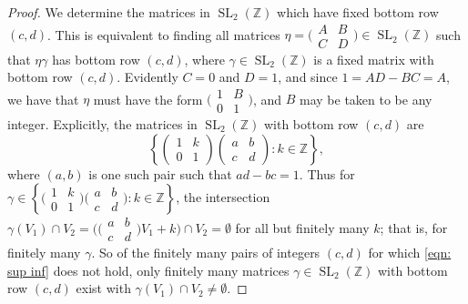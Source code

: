 \documentclass[10pt,leqno,twoside]{article}
\theoremstyle{plain}
\theoremstyle{definition}
\numberwithin{equation}{section}
\numberwithin{lem}{section}
\newcommand{\cbr}[1]{\left\{#1\right\}}
\DeclareMathOperator{\SL}{SL}
\newcommand{\slz}{\SL_2(\mathbb{Z})}
\begin{document}
\begin{proof}
    We determine the matrices in $\slz$ which have fixed bottom row $(c,d)$. This is equivalent to finding all matrices $\eta = \big(\!\begin{smallmatrix}
        A & B \\ C & D
    \end{smallmatrix}\!\big)\in \slz$ such that $\eta\gamma$ has bottom row $(c,d)$, where $\gamma\in \slz$ is a fixed matrix with  bottom row $(c,d)$. Evidently $C=0$ and $D = 1$, and since $1 = AD - BC = A$, we have that $\eta$ must have the form $\big(\!\begin{smallmatrix}
        1 & B \\ 0  & 1
    \end{smallmatrix}\!\big)$, and $B$ may be taken to be any integer. Explicitly, the matrices in $\slz$ with bottom row $(c,d)$ are \[\cbr{\begin{pmatrix}
        1 & k \\ 0 & 1
    \end{pmatrix}\begin{pmatrix}
        a & b \\ c & d
    \end{pmatrix}: k\in \mathbb{Z}},\]
    where $(a,b)$ is one such pair such that $ad-bc = 1$. Thus for $\gamma\in \cbr{\big(\!\begin{smallmatrix}
        1 & k \\ 0 & 1
    \end{smallmatrix}\!\big)\big(\!\begin{smallmatrix}
        a & b \\ c & d
    \end{smallmatrix}\!\big): k\in \mathbb{Z}}$, the intersection $\gamma(V_1)\cap V_2 = \big(\big(\!\begin{smallmatrix}
        a & b \\ c & d
    \end{smallmatrix}\!\big)V_1+ k\big)\cap V_2 =\emptyset$ for all but finitely many $k$; that is, for finitely many $\gamma$. So of the finitely many pairs of integers $(c,d)$ for which \cref{eqn: sup inf} does not hold, only finitely many matrices $\gamma\in \slz$ with bottom row $(c,d)$ exist with $\gamma(V_1)\cap V_2\neq \emptyset$.


\end{proof}
\end{document}
